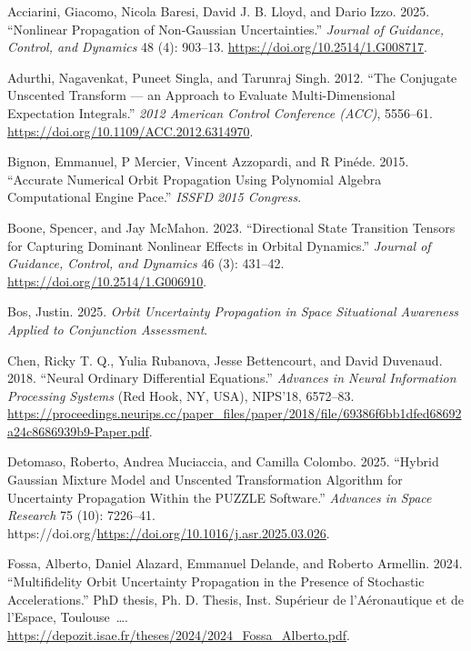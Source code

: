 \documentclass[
  letterpaper,
  DIV=11,
  numbers=noendperiod,
  oneside]{scrartcl}
\newlength{\cslhangindent}
\newenvironment{CSLReferences}[2] %
 {\begin{list}{}{%
  \setlength{\itemindent}{0pt}
  \setlength{\leftmargin}{0pt}
  \setlength{\parsep}{0pt}
  \ifodd #1
   \setlength{\leftmargin}{\cslhangindent}
   \setlength{\itemindent}{-1\cslhangindent}
  \fi
  \setlength{\itemsep}{#2\baselineskip}}}
 {\end{list}}
\begin{document}
\protect{}\label{refs}
\begin{CSLReferences}{1}{1}
Acciarini, Giacomo, Nicola Baresi, David J. B. Lloyd, and Dario Izzo.
2025. {``Nonlinear Propagation of Non-Gaussian Uncertainties.''}
\emph{Journal of Guidance, Control, and Dynamics} 48 (4): 903--13.
\url{https://doi.org/10.2514/1.G008717}.

Adurthi, Nagavenkat, Puneet Singla, and Tarunraj Singh. 2012. {``The
Conjugate Unscented Transform --- an Approach to Evaluate
Multi-Dimensional Expectation Integrals.''} \emph{2012 American Control
Conference (ACC)}, 5556--61.
\url{https://doi.org/10.1109/ACC.2012.6314970}.

Bignon, Emmanuel, P Mercier, Vincent Azzopardi, and R Pinéde. 2015.
{``Accurate Numerical Orbit Propagation Using Polynomial Algebra
Computational Engine Pace.''} \emph{ISSFD 2015 Congress}.

Boone, Spencer, and Jay McMahon. 2023. {``Directional State Transition
Tensors for Capturing Dominant Nonlinear Effects in Orbital Dynamics.''}
\emph{Journal of Guidance, Control, and Dynamics} 46 (3): 431--42.
\url{https://doi.org/10.2514/1.G006910}.

Bos, Justin. 2025. \emph{Orbit Uncertainty Propagation in Space
Situational Awareness Applied to Conjunction Assessment}.

Chen, Ricky T. Q., Yulia Rubanova, Jesse Bettencourt, and David
Duvenaud. 2018. {``Neural Ordinary Differential Equations.''}
\emph{Advances in Neural Information Processing Systems} (Red Hook, NY,
USA), NIPS'18, 6572--83.
\url{https://proceedings.neurips.cc/paper_files/paper/2018/file/69386f6bb1dfed68692a24c8686939b9-Paper.pdf}.

Detomaso, Roberto, Andrea Muciaccia, and Camilla Colombo. 2025.
{``Hybrid Gaussian Mixture Model and Unscented Transformation Algorithm
for Uncertainty Propagation Within the PUZZLE Software.''}
\emph{Advances in Space Research} 75 (10): 7226--41.
https://doi.org/\url{https://doi.org/10.1016/j.asr.2025.03.026}.

Fossa, Alberto, Daniel Alazard, Emmanuel Delande, and Roberto Armellin.
2024. {``Multifidelity Orbit Uncertainty Propagation in the Presence of
Stochastic Accelerations.''} PhD thesis, Ph. D. Thesis, Inst.
Sup{é}rieur de l'A{é}ronautique et de l'Espace, Toulouse~\ldots.
\url{https://depozit.isae.fr/theses/2024/2024_Fossa_Alberto.pdf}.


\end{CSLReferences}
\end{document}
